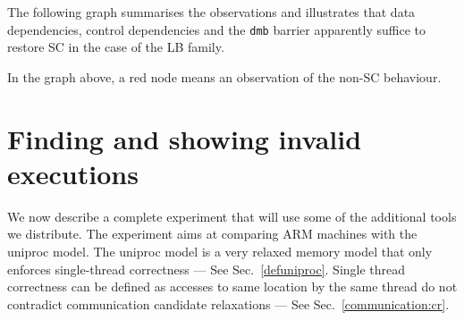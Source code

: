 \ifhevea
The following graph summarises the observations and illustrates
that data dependencies, control dependencies and the \texttt{dmb} barrier
apparently suffice to restore SC in the case of the LB family.
\begin{center}\end{center}
In the graph above, a red node means an observation of the non-SC behaviour.
\fi

\section{Finding\label{example:invalid} and showing invalid executions}
We now describe a complete experiment that will use some of
the additional tools we distribute.
The experiment aims at comparing ARM machines with the uniproc model.
The uniproc model is a very relaxed memory model that only enforces
single-thread correctness --- See Sec.~\ref{defuniproc}.
Single thread correctness can be defined as accesses to same
location by the same thread do not contradict communication candidate
relaxations --- See Sec.~\ref{communication:cr}.

